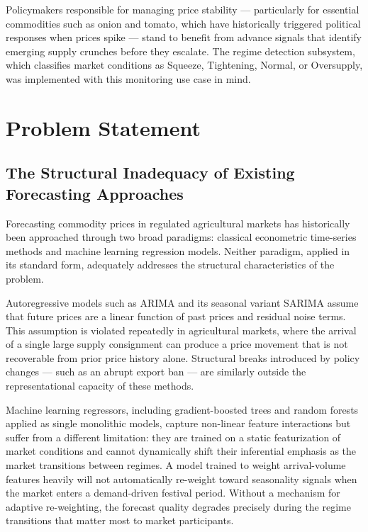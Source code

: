 \documentclass[12pt,a4paper]{report}
\begin{document}
Policymakers responsible for managing price stability — particularly for essential commodities such as onion and tomato, which have historically triggered political responses when prices spike — stand to benefit from advance signals that identify emerging supply crunches before they escalate. The regime detection subsystem, which classifies market conditions as Squeeze, Tightening, Normal, or Oversupply, was implemented with this monitoring use case in mind.

\section{Problem Statement}

\subsection{The Structural Inadequacy of Existing Forecasting Approaches}

Forecasting commodity prices in regulated agricultural markets has historically been approached through two broad paradigms: classical econometric time-series methods and machine learning regression models. Neither paradigm, applied in its standard form, adequately addresses the structural characteristics of the problem.

Autoregressive models such as ARIMA and its seasonal variant SARIMA assume that future prices are a linear function of past prices and residual noise terms. This assumption is violated repeatedly in agricultural markets, where the arrival of a single large supply consignment can produce a price movement that is not recoverable from prior price history alone. Structural breaks introduced by policy changes — such as an abrupt export ban — are similarly outside the representational capacity of these methods.

Machine learning regressors, including gradient-boosted trees and random forests applied as single monolithic models, capture non-linear feature interactions but suffer from a different limitation: they are trained on a static featurization of market conditions and cannot dynamically shift their inferential emphasis as the market transitions between regimes. A model trained to weight arrival-volume features heavily will not automatically re-weight toward seasonality signals when the market enters a demand-driven festival period. Without a mechanism for adaptive re-weighting, the forecast quality degrades precisely during the regime transitions that matter most to market participants.
\end{document}
